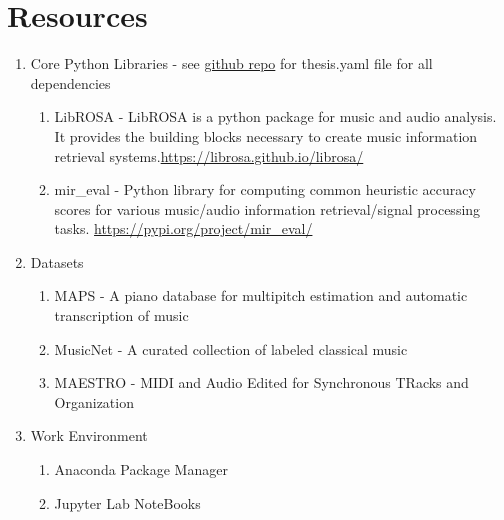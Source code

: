 \section{Resources}

\begin{enumerate}
    \item Core Python Libraries - see
          \href{https://github.com/OliverIgnetik/engn4200_thesis}{github repo}
          for thesis.yaml file for all dependencies
          \begin{enumerate}
              \item LibROSA - LibROSA is a python package for music and audio analysis. It provides the building blocks necessary to create music information retrieval systems.\newline \url{https://librosa.github.io/librosa/}
              \item mir\_eval -  Python library for computing common heuristic accuracy scores for various music/audio information retrieval/signal processing tasks. \newline \url{https://pypi.org/project/mir_eval/}
          \end{enumerate}
    \item Datasets
          \begin{enumerate}
              \item MAPS - A piano database for multipitch estimation and automatic
                    transcription of music \cite{MAPS:Emiya}
              \item MusicNet - A curated collection of labeled classical music \cite{thickstun2018invariances}
              \item MAESTRO - MIDI and Audio Edited for Synchronous TRacks and
                    Organization \cite{hawthorne2018enabling}
          \end{enumerate}

    \item Work Environment
          \begin{enumerate}
              \item Anaconda Package Manager
              \item Jupyter Lab NoteBooks
          \end{enumerate}
\end{enumerate}
